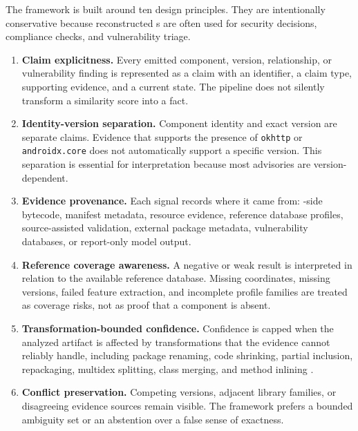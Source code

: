 The framework is built around ten design principles. They are intentionally
conservative because reconstructed \SBOM{}s are often used for security
decisions, compliance checks, and vulnerability triage.

\begin{enumerate}[label=\textbf{P\arabic*.},leftmargin=2.2cm]
  \item \textbf{Claim explicitness.}
  Every emitted component, version, relationship, or vulnerability finding is
  represented as a claim with an identifier, a claim type, supporting evidence,
  and a current state. The pipeline does not silently transform a similarity
  score into a fact.

  \item \textbf{Identity-version separation.}
  Component identity and exact version are separate claims. Evidence that
  supports the presence of \texttt{okhttp} or \texttt{androidx.core} does not
  automatically support a specific version. This separation is essential for
  \CVE interpretation because most advisories are version-dependent.

  \item \textbf{Evidence provenance.}
  Each signal records where it came from: \APK-side bytecode, manifest
  metadata, resource evidence, reference database profiles, source-assisted
  validation, external package metadata, vulnerability databases, or
  report-only model output.

  \item \textbf{Reference coverage awareness.}
  A negative or weak result is interpreted in relation to the available
  reference database. Missing coordinates, missing versions, failed feature
  extraction, and incomplete profile families are treated as coverage risks,
  not as proof that a component is absent.

  \item \textbf{Transformation-bounded confidence.}
  Confidence is capped when the analyzed artifact is affected by transformations
  that the evidence cannot reliably handle, including package renaming, code
  shrinking, partial inclusion, repackaging, multidex splitting, class merging,
  and method inlining \cite{androidShrinkCode,xie2024libhunter}.

  \item \textbf{Conflict preservation.}
  Competing versions, adjacent library families, or disagreeing evidence
  sources remain visible. The framework prefers a bounded ambiguity set or an
  abstention over a false sense of exactness.


\end{enumerate}
